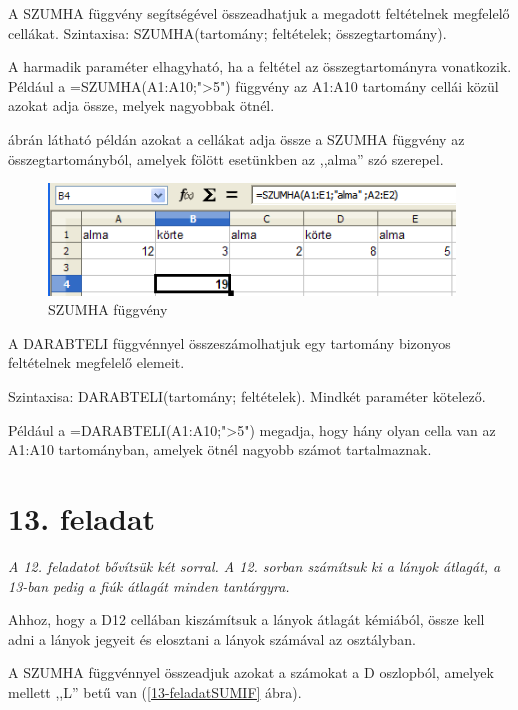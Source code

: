 A SZUMHA függvény segítségével összeadhatjuk a megadott
feltételnek megfelelő cellákat. Szintaxisa: SZUMHA(tartomány;
feltételek; összegtartomány).

A harmadik paraméter elhagyható, ha a feltétel az
összegtartományra vonatkozik. Például a
=SZUMHA(A1:A10;">5")
függvény az A1:A10 tartomány cellái közül azokat adja
össze, melyek nagyobbak ötnél.

 ábrán látható példán azokat a cellákat adja össze
a SZUMHA függvény az összegtartományból, amelyek fölött
esetünkben az ,,alma'' szó
szerepel.

\begin{figure}[!h]
\begin{center}
\includegraphics[width=10.799cm]{oocalcv2-img73.png}
\caption{SZUMHA függvény}\label{SUMIFFüggvény}
\end{center}
\end{figure}

A DARABTELI függvénnyel összeszámolhatjuk egy tartomány bizonyos
feltételnek megfelelő elemeit.

Szintaxisa: DARABTELI(tartomány; feltételek). Mindkét paraméter
kötelező.

Például a =DARABTELI(A1:A10;">5") megadja,
hogy hány olyan cella van az A1:A10 tartományban, amelyek ötnél
nagyobb számot tartalmaznak.


\section{13. feladat}
{\itshape
A 12. feladatot bővítsük két sorral. A 12. sorban
számítsuk ki a lányok átlagát, a 13-ban pedig a fiúk
átlagát minden tantárgyra.}

Ahhoz, hogy a D12 cellában kiszámítsuk a lányok átlagát
kémiából, össze kell adni a lányok jegyeit és elosztani a
lányok számával az osztályban.

A SZUMHA függvénnyel összeadjuk azokat a számokat a D
oszlopból, amelyek mellett ,,L''
betű van (\ref{13-feladatSUMIF} ábra).

